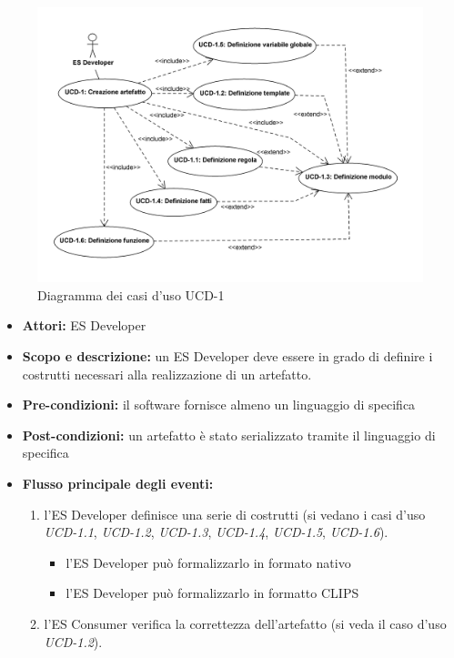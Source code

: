 
\begin{figure}
\centering
\includegraphics[width=1.1\textwidth]{Immagini/Capitolo2/UseCases/UCD-1.png}
\caption{Diagramma dei casi d'uso UCD-1}\label{fig:uc-ucd-1}
\end{figure}


\begin{itemize}
	\item \textbf{Attori:} ES Developer
	\item \textbf{Scopo e descrizione:} un ES Developer deve essere in grado di definire i costrutti necessari alla realizzazione di un artefatto.
	\item \textbf{Pre-condizioni:} il software fornisce almeno un linguaggio di specifica
	\item \textbf{Post-condizioni:} un artefatto è stato serializzato tramite il linguaggio di specifica
	\item \textbf{Flusso principale degli eventi:}
		\begin{enumerate}
			\item l'ES Developer definisce una serie di costrutti (si vedano i casi d'uso \emph{UCD-1.1}, \emph{UCD-1.2}, \emph{UCD-1.3}, \emph{UCD-1.4}, \emph{UCD-1.5}, \emph{UCD-1.6}).
			\begin{itemize}
				\item l'ES Developer può formalizzarlo in formato nativo
				\item l'ES Developer può formalizzarlo in formatto CLIPS
			\end{itemize}
			\item l'ES Consumer verifica la correttezza dell'artefatto (si veda il caso d'uso \emph{UCD-1.2}).
		\end{enumerate}
\end{itemize}


